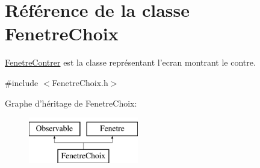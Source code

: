 \hypertarget{classFenetreChoix}{\section{\-Référence de la classe \-Fenetre\-Choix}
\label{classFenetreChoix}
}


\hyperlink{classFenetreContrer}{\-Fenetre\-Contrer} est la classe représentant l'ecran montrant le contre.  




{\ttfamily \#include $<$\-Fenetre\-Choix.\-h$>$}

\-Graphe d'héritage de \-Fenetre\-Choix\-:\begin{figure}[H]
\begin{center}
\leavevmode
\includegraphics[height=2.000000cm]{classFenetreChoix}
\end{center}
\end{figure}
